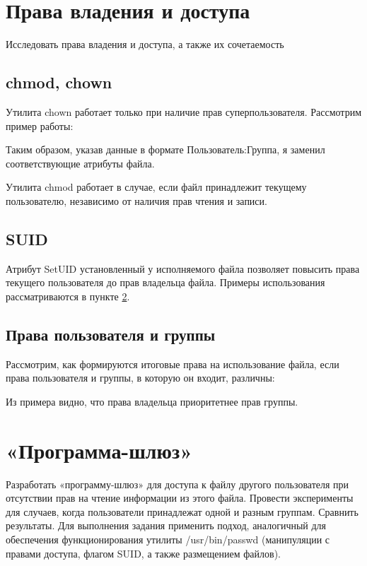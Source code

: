 \documentclass[a4paper]{article}
\begin{document}
\section{Права владения и доступа} Исследовать права владения и доступа, а также их сочетаемость
\subsection{chmod, chown} Утилита chown работает только при наличие прав суперпользователя. Рассмотрим пример работы:

Таким образом, указав данные в формате Пользователь:Группа, я заменил соответствующие атрибуты файла.\\
\par Утилита chmod работает в случае, если файл принадлежит текущему пользователю, независимо от наличия прав чтения и записи.

\subsection{SUID} Атрибут SetUID установленный у исполняемого файла позволяет повысить права текущего пользователя до прав владельца файла. Примеры использования рассматриваются в пункте \ref{getaway}.
\subsection{ Права пользователя и группы} Рассмотрим, как формируются итоговые права на использование файла, если права пользователя и группы, в которую он входит, различны:

Из примера видно, что права владельца приоритетнее прав группы.

\section{«Программа-шлюз» } \label{getaway}Разработать «программу-шлюз» для доступа к файлу другого пользователя при отсутствии прав на чтение информации из этого файла. Провести эксперименты для случаев, когда пользователи принадлежат одной и разным группам. Сравнить результаты. Для выполнения задания применить подход, аналогичный для обеспечения функционирования утилиты /usr/bin/passwd (манипуляции с правами доступа, флагом SUID, а также размещением файлов).
\end{document}
